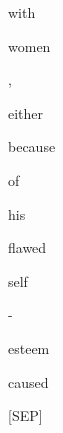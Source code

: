 \documentclass[varwidth=150mm]{standalone}
\begin{document}
\begin{CJK*}{UTF8}{gbsn}
{{{\colorbox{red!0.0}{\strut with} \colorbox{red!0.0}{\strut women} \colorbox{red!0.0}{\strut ,} \colorbox{red!0.0}{\strut either} \colorbox{red!0.0}{\strut because} \colorbox{red!0.0}{\strut of} \colorbox{red!0.0}{\strut his} \colorbox{red!3.733712911605835}{\strut flawed} \colorbox{red!2.234309673309326}{\strut self} \colorbox{red!3.9039578437805176}{\strut -} \colorbox{red!2.6180918216705322}{\strut esteem} \colorbox{red!24.06240463256836}{\strut caused} \colorbox{red!14.013101577758789}{\strut [SEP]}
}}}
\end{CJK*}
\end{document}
